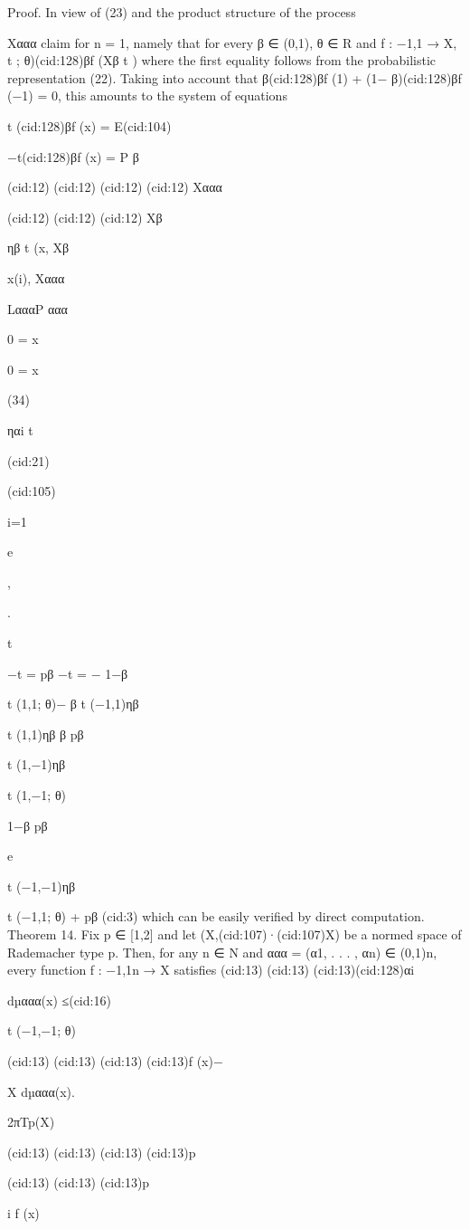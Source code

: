 Proof. In view of (23) and the product structure of the process {Xααα
claim for n = 1, namely that for every β ∈ (0,1), θ ∈ R and f : {−1,1} → X,
t ; θ)(cid:128)βf (Xβ
t )
where the ﬁrst equality follows from the probabilistic representation (22). Taking into account
that β(cid:128)βf (1) + (1− β)(cid:128)βf (−1) = 0, this amounts to the system of equations

t (cid:128)βf (x) = E(cid:104)

−t(cid:128)βf (x) = P β

(cid:12)
(cid:12)
(cid:12)
(cid:12) Xααα

(cid:12)
(cid:12)
(cid:12) Xβ

ηβ
t (x, Xβ

x(i), Xααα

LαααP ααα

0 = x

0 = x

(34)

ηαi
t

(cid:21)

(cid:105)

i=1

e

,

.

t

−t = pβ
−t = − 1−β

t (1,1; θ)− β
t (−1,1)ηβ

t (1,1)ηβ
β pβ

t (1,−1)ηβ

t (1,−1; θ)

1−β pβ

e

t (−1,−1)ηβ

t (−1,1; θ) + pβ
(cid:3)
which can be easily veriﬁed by direct computation.
Theorem 14. Fix p ∈ [1,2] and let (X,(cid:107)·(cid:107)X) be a normed space of Rademacher type p. Then, for any
n ∈ N and ααα = (α1, . . . , αn) ∈ (0,1)n, every function f : {−1,1}n → X satisﬁes
(cid:13)
(cid:13)
(cid:13)(cid:128)αi

dµααα(x) ≤(cid:16)

t (−1,−1; θ)

(cid:13)
(cid:13)
(cid:13)
(cid:13)f (x)−

X dµααα(x).

2πTp(X)

(cid:13)
(cid:13)
(cid:13)
(cid:13)p

(cid:13)
(cid:13)
(cid:13)p

i f (x)

}
